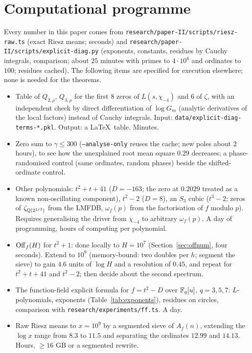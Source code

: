 \documentclass[11pt,a4paper]{article}
\theoremstyle{remark}\newtheorem{remark}[theorem]{Remark}
\begin{document}
\appendix
\section{Computational programme}\label{app:comp}

Every number in this paper comes from \texttt{research/paper-II/scripts/riesz-raw.ts} (exact Riesz means; seconds)
and \texttt{research/paper-II/scripts/explicit-diag.py} (exponents, constants, residues by Cauchy integrals,
comparison; about $25$ minutes with primes to $4\cdot10^6$ and ordinates to $100$; residues cached). The
following items are specified for execution elsewhere; none is needed for the theorems.
\begin{itemize}
\item[(C1)] Table of $Q_{2,\rho}$, $Q_{3,\rho}$ for the first $8$ zeros of $L(s,\chi_{-4})$ and $6$ of $\zeta$, with an
independent check by direct differentiation of $\log G_m$ (analytic derivatives of the local factors) instead
of Cauchy integrals. Input: \texttt{data/explicit-diag-terms-*.pkl}. Output: a \LaTeX\ table. Minutes.
\item[(C2)] Zero sum to $\gamma\le300$ (\texttt{--analyse-only} reuses the cache; new poles about $2$ hours), to
see how the unexplained root mean square $0.29$ decreases; a phase-randomised control (same ordinates,
random phases) beside the shifted-ordinate control.
\item[(C3)] Other polynomials: $t^2+t+41$ ($D=-163$; the zero at $0.2029$ treated as a known non-oscillating
component), $t^2-2$ ($D=8$), an $S_3$ cubic ($t^3-2$; zeros of $\zeta_{\mathbb{Q}(2^{1/3})}$ from the LMFDB, $\omega_f(p)$
from the factorisation of $f$ modulo $p$). Requires generalising the driver from $\chi_{-4}$ to arbitrary
$\omega_f(p)$. A day of programming, hours of computing per polynomial.
\item[(C4)] $\mathrm{Off}_f(H)$ for $t^2+1$: done locally to $H=10^7$ (Section~\ref{sec:offnum}, four seconds).
Extend to $10^9$ (memory-bound: two doubles per $h$; segment the sieve) to gain $4.6$ units of $\log H$ and a
resolution of $0.45$, and repeat for $t^2+t+41$ and $t^2-2$; then decide about the second spectrum.
\item[(C5)] The function-field explicit formula for $f=t^2-D$ over $\mathbb{F}_q[u]$, $q=3,5,7$: $L$-polynomials,
exponents (Table~\ref{tab:exponents}), residues on circles, comparison with \texttt{research/experiments/ff.ts}. A day.
\item[(C6)] Raw Riesz means to $x=10^9$ by a segmented sieve of $A_f(n)$, extending the $\log x$ range from
$8.3$ to $11.5$ and separating the ordinates $12.99$ and $14.13$. Hours, $\ge16$ GB or a segmented rewrite.
\end{itemize}
\end{document}
